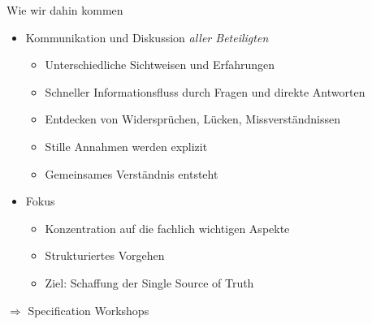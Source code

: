 %
%
%
%

\begin{frame}{Wie wir dahin kommen}


\begin{itemize}
	\item Kommunikation und Diskussion \em aller \em Beteiligten 
	\begin{itemize}
		\item Unterschiedliche Sichtweisen und Erfahrungen
		\item Schneller Informationsfluss durch Fragen und direkte Antworten
		\item Entdecken von Widersprüchen, Lücken, Missverständnissen
		\item Stille Annahmen werden explizit
		\item Gemeinsames Verständnis entsteht
	\end{itemize}
	
	\item Fokus
	\begin{itemize}
		\item Konzentration auf die fachlich wichtigen Aspekte
                \item Strukturiertes Vorgehen
		\item Ziel: Schaffung der Single Source of Truth
	\end{itemize}
\end{itemize}


\vspace{1em}

$\Rightarrow$ Specification Workshops

\end{frame}


